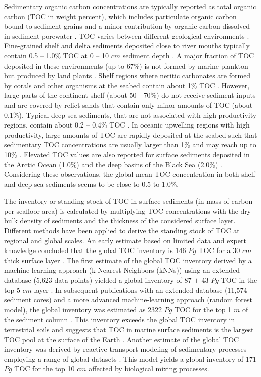 \documentclass[journal abbreviation, manuscript]{copernicus}
\begin{document}
Sedimentary organic carbon concentrations are typically reported as total organic carbon (TOC in weight percent), which includes particulate organic carbon bound to sediment grains and a minor contribution by organic carbon dissolved in sediment porewater \citep{HEDGES199581}. TOC varies between different geological environments \citep{Emerson1988}. Fine-grained shelf and delta sediments deposited close to river mouths typically contain 0.5 – 1.0\% TOC at 0 – 10 $cm$ sediment depth \citep{Berner1982}. A major fraction of TOC deposited in these environments (up to 67\%) is not formed by marine plankton but produced by land plants \citep{Burdige2005}. Shelf regions where neritic carbonates are formed by corals and other organisms at the seabed contain about 1\% TOC \citep{Berner1982}. However, large parts of the continent shelf (about 50 - 70\%) do not receive sediment inputs and are covered by relict sands \citep{emery1968relict, Hall2002} that contain only minor amounts of TOC (about 0.1\%). Typical deep-sea sediments, that are not associated with high productivity regions, contain about 0.2 – 0.4\% TOC \citep{Baturin2007, Berner1982, LeeTOCkNN, SEITER20042001}. In oceanic upwelling regions with high productivity, large amounts of TOC are rapidly deposited at the seabed such that sedimentary TOC concentrations are usually larger than 1\% and may reach up to 10\% \citep{Berner1982, LeeTOCkNN, SEITER20042001}. Elevated TOC values are also reported for surface sediments deposited in the Arctic Ocean (1.0\%) and the deep basins of the Black Sea (2.0\%) \citep{Berner1982, LeeTOCkNN, SEITER20042001}. Considering these observations, the global mean TOC concentration in both shelf and deep-sea sediments seems to be close to 0.5 to 1.0\%.


The inventory or standing stock of TOC in surface sediments (in mass of carbon per seafloor area) is calculated by multiplying TOC concentrations with the dry bulk density of sediments and the thickness of the considered surface layer. Different methods have been applied to derive the standing stock of TOC at regional and global scales. An early estimate based on limited data and expert knowledge concluded that the global TOC inventory is 146 $Pg$ TOC for a 30 $cm$ thick surface layer \citep{Emerson1988}. The first estimate of the global TOC inventory derived by a machine-learning approach (k-Nearest Neighbors (kNNs)) using an extended database (5,623 data points) yielded a global inventory of 87 $\pm$ 43 $Pg$ TOC in the top 5 $cm$ layer \citep{LeeTOCkNN}. In subsequent publications with an extended database (11,574 sediment cores) and a more advanced machine-learning approach (random forest model), the global inventory was estimated as 2322 $Pg$ TOC for the top 1 $m$ of the sediment column \citep{atwood2020}. This inventory exceeds the global TOC inventory in terrestrial soils and suggests that TOC in marine surface sediments is the largest TOC pool at the surface of the Earth \citep{atwood2020}. Another estimate of the global TOC inventory was derived by reactive transport modeling of sedimentary processes employing a range of global datasets \citep{larowe2020b}. This model yields a global inventory of 171 $Pg$ TOC for the top 10 $cm$ affected by biological mixing processes.
\end{document}
